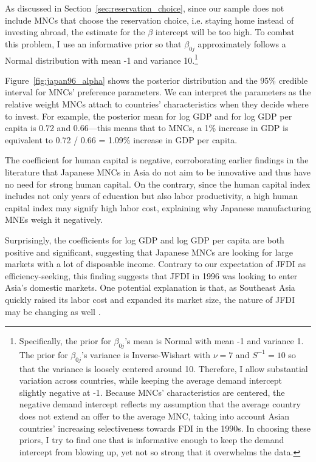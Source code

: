As discussed in Section~\ref{sec:reservation_choice}, since our sample does not
include MNCs that choose the reservation choice, i.e. staying home instead of
investing abroad, the estimate for the $\beta$ intercept will be too high. To
combat this problem, I use an informative prior so that $\beta_{0j}$
approximately follows a Normal distribution with mean -1 and variance
10.\footnote{Specifically, the prior for $\beta_{0j}$'s mean is Normal with mean
  -1 and variance 1. The prior for $\beta_{0j}$'s variance is Inverse-Wishart
  with $\nu = 7$ and $S^{-1} = 10$ so that the variance is loosely centered
  around 10. Therefore, I allow substantial variation across countries, while
  keeping the average demand intercept slightly negative at -1. Because MNCs'
  characteristics are centered, the negative demand intercept reflects my
  assumption that the average country does not extend an offer to the average
  MNC, taking into account Asian countries' increasing selectiveness towards FDI in
  the 1990s. In choosing these priors, I try to find one that is informative
  enough to keep the demand intercept from blowing up, yet not so strong that it
  overwhelms the data.}

Figure~\ref{fig:japan96_alpha} shows the posterior distribution and the 95\%
credible interval for MNCs' preference parameters. We can interpret the
parameters as the relative weight MNCs attach to countries' characteristics when
they decide where to invest. For example, the posterior mean for log GDP and for
log GDP per capita is 0.72 and 0.66---this means that to MNCs, a 1\% increase in
GDP is equivalent to 0.72 / 0.66 = 1.09\% increase in GDP per capita.

The coefficient for human capital
is negative, corroborating earlier findings in the literature that Japanese MNCs
in Asia do not aim to be innovative and thus have no need for strong human
capital. On the contrary, since the human capital index includes not only years
of education but also labor productivity, a high human capital index may signify
high labor cost, explaining why Japanese manufacturing MNEs weigh it negatively.

Surprisingly, the coefficients for log GDP and log GDP per capita are both positive and
significant, suggesting that Japanese MNCs are looking for large markets with a
lot of disposable income. Contrary to our expectation of JFDI as
efficiency-seeking, this finding suggests that JFDI in 1996 was looking to enter
Asia's domestic markets. One potential explanation is that, as Southeast Asia
quickly raised its labor cost and expanded its market size, the nature of JFDI
may be changing as well \citep[44]{Jomo2003}.

